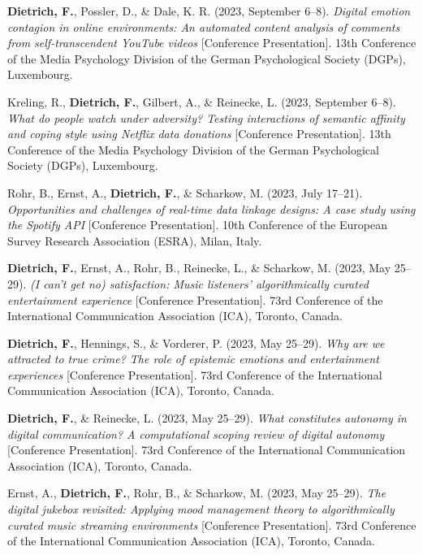 \documentclass[11pt,a4paper,]{awesome-cv}
\newlength{\cslhangindent}
\newenvironment{CSLReferences}[2] %
 {\begin{list}{}{%
  \setlength{\itemindent}{0pt}
  \setlength{\leftmargin}{0pt}
  \setlength{\parsep}{0pt}
  \ifodd #1
   \setlength{\leftmargin}{\cslhangindent}
   \setlength{\itemindent}{-1\cslhangindent}
  \fi
  \setlength{\itemsep}{#2\baselineskip}}}
 {\end{list}}
\begin{document}
\begin{CSLReferences}{1}{0}
\textbf{Dietrich, F.}, Possler, D., \& Dale, K. R. (2023, September
6--8). \emph{Digital emotion contagion in online environments: An
automated content analysis of comments from self-transcendent YouTube
videos} {[}Conference Presentation{]}. 13th Conference of the Media
Psychology Division of the German Psychological Society (DGPs),
Luxembourg.

Kreling, R., \textbf{Dietrich, F.}, Gilbert, A., \& Reinecke, L. (2023,
September 6--8). \emph{What do people watch under adversity? Testing
interactions of semantic affinity and coping style using Netflix data
donations} {[}Conference Presentation{]}. 13th Conference of the Media
Psychology Division of the German Psychological Society (DGPs),
Luxembourg.

Rohr, B., Ernst, A., \textbf{Dietrich, F.}, \& Scharkow, M. (2023, July
17--21). \emph{Opportunities and challenges of real-time data linkage
designs: A case study using the Spotify API} {[}Conference
Presentation{]}. 10th Conference of the European Survey Research
Association (ESRA), Milan, Italy.

\textbf{Dietrich, F.}, Ernst, A., Rohr, B., Reinecke, L., \& Scharkow,
M. (2023, May 25--29). \emph{(I can't get no) satisfaction: Music
listeners' algorithmically curated entertainment experience}
{[}Conference Presentation{]}. 73rd Conference of the International
Communication Association (ICA), Toronto, Canada.

\textbf{Dietrich, F.}, Hennings, S., \& Vorderer, P. (2023, May 25--29).
\emph{Why are we attracted to true crime? The role of epistemic emotions
and entertainment experiences} {[}Conference Presentation{]}. 73rd
Conference of the International Communication Association (ICA),
Toronto, Canada.

\textbf{Dietrich, F.}, \& Reinecke, L. (2023, May 25--29). \emph{What
constitutes autonomy in digital communication? A computational scoping
review of digital autonomy} {[}Conference Presentation{]}. 73rd
Conference of the International Communication Association (ICA),
Toronto, Canada.

Ernst, A., \textbf{Dietrich, F.}, Rohr, B., \& Scharkow, M. (2023, May
25--29). \emph{The digital jukebox revisited: Applying mood management
theory to algorithmically curated music streaming environments}
{[}Conference Presentation{]}. 73rd Conference of the International
Communication Association (ICA), Toronto, Canada.


\end{CSLReferences}
\end{document}

